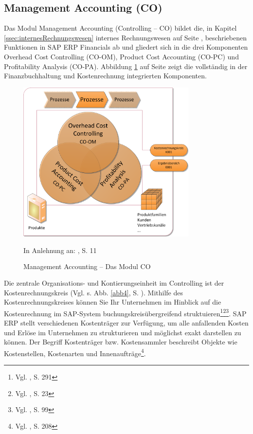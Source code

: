 \subsection{Management Accounting (CO)} %
Das Modul Management Accounting (Controlling -- CO) bildet die, in Kapitel \ref{ssec:internesRechnungswesen} internes Rechnungswesen auf Seite \pageref{ssec:internesRechnungswesen}, beschriebenen Funktionen in SAP ERP Financials ab und gliedert sich in die drei Komponenten Overhead Cost Controlling (CO-OM), Product Cost Accounting (CO-PC) und Profitability Analysis (CO-PA). Abbildung \ref{abb3} auf Seite \pageref{abb3} zeigt die vollständig in der Finanzbuchhaltung und Kostenrechnung integrierten Komponenten. 
\begin{figure}[htbp]
\begin{center}
\includegraphics[width=0.8\textwidth]{Images/managementAccounting.png}

   {\footnotesize In Anlehnung an: \cite{SAPCOOMABC2001}, S. 11}
   \caption[Management Accounting -- Das Modul CO]{Management Accounting -- Das Modul CO}\label{abb3}
\end{center}
\end{figure}\noindent
Die zentrale Organisations- und Kontierungseinheit im Controlling ist der Kostenrechnungskreis (Vgl. s. Abb. \ref{abb4}, S. \pageref{abb4}). Mithilfe des Kostenrechnungskreises können Sie Ihr Unternehmen im Hinblick auf die Kostenrechnung im SAP-System buchungskreisübergreifend struktuieren\footnote{Vgl. \cite{Patel2009}, S. 291}\footnote{Vgl. \cite{Friedl2008}, S. 23}\footnote{Vgl. \cite{Klein2010}, S. 99}. SAP ERP stellt verschiedenen Kostenträger zur Verfügung, um alle anfallenden Kosten und Erlöse im Unternehmen zu strukturieren und möglichst exakt darstellen zu können. Der Begriff Kostenträger bzw. Kostensammler beschreibt Objekte wie Kostenstellen, Kostenarten und Innenaufträge\footnote{Vgl. \cite{Patel2009}, S. 208}. 
